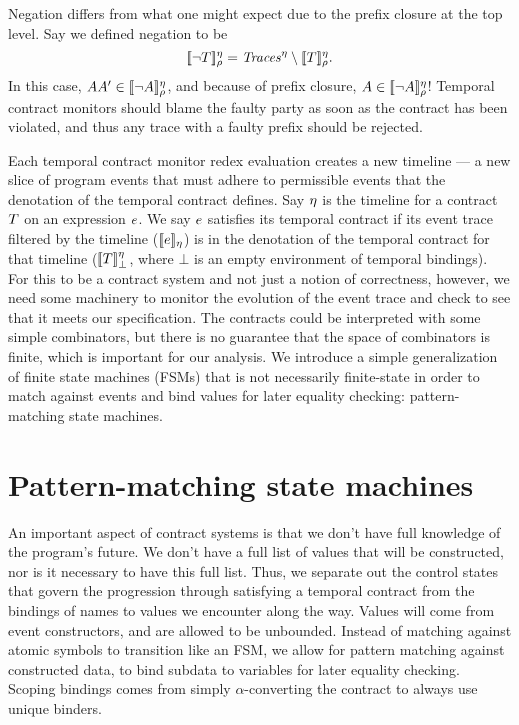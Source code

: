 \documentclass[preprint,onecolumn,9pt]{sigplanconf} %
\begin{document}
Negation differs from what one might expect due to the prefix closure at the top level.
%
Say we defined negation to be
\begin{equation*}
  [\![ \neg T ]\!]^{\eta}_{\rho} = \mathit{Traces}^\eta \setminus [\![ T ]\!]^{\eta}_{\rho}\text.
\end{equation*}
In this case, $AA' \in [\![ \neg A ]\!]^{\eta}_{\rho}$, and because of prefix closure, $A \in [\![ \neg A ]\!]^{\eta}_{\rho}$!
%
Temporal contract monitors should blame the faulty party as soon as the contract has been violated, and thus any trace with a faulty prefix should be rejected.

Each temporal contract monitor redex evaluation creates a new timeline --- a new slice of program events that must adhere to permissible events that the denotation of the temporal contract defines.
%
Say $\eta$ is the timeline for a contract $T$ on an expression $e$.
%
We say $e$ satisfies its temporal contract if its event trace filtered by the timeline ($[\![ e ]\!]_\eta$) is in the denotation of the temporal contract for that timeline ($[\![ T ]\!]^{\eta}_{\bot}$, where $\bot$ is an empty environment of temporal bindings).
%
For this to be a contract system and not just a notion of correctness, however, we need some machinery to monitor the evolution of the event trace and check to see that it meets our specification.
%
The contracts could be interpreted with some simple combinators, but there is no guarantee that the space of combinators is finite, which is important for our analysis.
%
We introduce a simple generalization of finite state machines (FSMs) that is not necessarily finite-state in order to match against events and bind values for later equality checking: pattern-matching state machines.

\section{Pattern-matching state machines}

An important aspect of contract systems is that we don't have full knowledge of the program's future.
%
We don't have a full list of values that will be constructed, nor is it necessary to have this full list.
%
Thus, we separate out the control states that govern the progression through satisfying a temporal contract from the bindings of names to values we encounter along the way.
%
Values will come from event constructors, and are allowed to be unbounded.
%
Instead of matching against atomic symbols to transition like an FSM, we allow for pattern matching against constructed data, to bind subdata to variables for later equality checking.
%
Scoping bindings comes from simply $\alpha$-converting the contract to always use unique binders.
%
\end{document}
